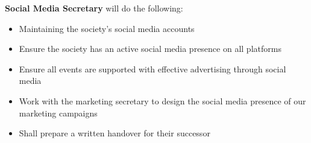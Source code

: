 \begin{subclause}
  \textbf{Social Media Secretary} will do the following:
  \begin{itemize}[label=--,topsep=0em,itemsep=0em]
    \item Maintaining the society's social media accounts
    \item Ensure the society has an active social media presence on all platforms
    \item Ensure all events are supported with effective advertising through social media
    \item Work with the marketing secretary to design the social media presence of our marketing campaigns 
    \item Shall prepare a written handover for their successor
  \end{itemize}
\end{subclause}
